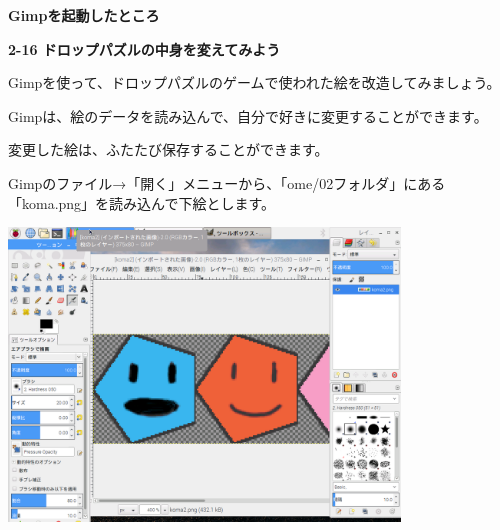 \documentclass[a4paper,dvipdfmx]{jarticle}
\newcommand\textstyleqwerty[1]{#1}
\begin{document}
\textstyleqwerty{\textbf{Gimpを起動したところ}}


\bigskip


\bigskip


\bigskip


\bigskip


\bigskip


\bigskip

{\bfseries
2-16
ドロップパズルの中身を変えてみよう}


\bigskip

Gimpを使って、ドロップパズルのゲームで使われた絵を改造してみましょう。

Gimpは、絵のデータを読み込んで、自分で好きに変更することができます。

変更した絵は、ふたたび保存することができます。

Gimpのファイル→「開く」メニューから、「ome/02フォルダ」にある「koma.png」を読み込んで下絵とします。


\bigskip



\begin{center}
\includegraphics[width=10.403cm,height=7.811cm]{text02-img/text02-img038.png}

\end{center}

\bigskip


\bigskip


\bigskip


\bigskip


\bigskip


\bigskip


\bigskip


\bigskip


\bigskip


\bigskip
\end{document}
